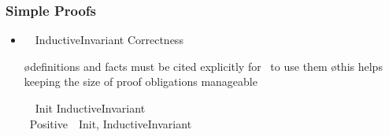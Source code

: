 \begin{frame}
  \frametitle{Simple Proofs}

  \begin{itemize}
  \item {}

    \medskip

    \qquad\begin{tlablock}
      \LEMMA\ \ InductiveInvariant \implies Correctness\\
    \end{tlablock}

\pause



    \begin{itemize}
    \o definitions and facts must be cited explicitly for \tlaps\ to use them
    \o this helps keeping the size of proof obligations manageable
    \end{itemize}

\pause
  \oo {}

    \medskip

    \qquad\begin{tlablock}
      \LEMMA\ \ Init \implies InductiveInvariant\\
      \BY\ Positive\ \DEFS\ Init, InductiveInvariant
    \end{tlablock}

  \oo {}
  \end{itemize}
  
\end{frame}

